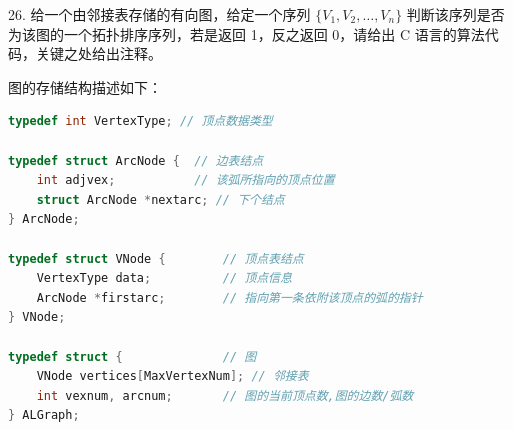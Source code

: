 \vspace{15em}

\newpage

26. 给一个由邻接表存储的有向图，给定一个序列 \(\{V_{1}, V_{2}, \dots, V_{n}\}\) 判断该序列是否为该图的一个拓扑排序序列，若是返回 1，反之返回 0，请给出 C 语言的算法代码，关键之处给出注释。

图的存储结构描述如下：

\begin{lstlisting}[language=C, basicstyle=\ttfamily]
typedef int VertexType; // 顶点数据类型

typedef struct ArcNode {  // 边表结点
    int adjvex;           // 该弧所指向的顶点位置
    struct ArcNode *nextarc; // 下个结点
} ArcNode;

typedef struct VNode {        // 顶点表结点
    VertexType data;          // 顶点信息
    ArcNode *firstarc;        // 指向第一条依附该顶点的弧的指针
} VNode;

typedef struct {              // 图
    VNode vertices[MaxVertexNum]; // 邻接表
    int vexnum, arcnum;       // 图的当前顶点数,图的边数/弧数
} ALGraph;
\end{lstlisting}
